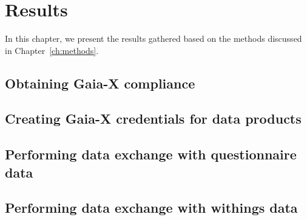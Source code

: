 \chapter{Results}\label{ch:results}

\begin{chapterabstract}
    In this chapter, we present the results gathered based on the methods discussed in Chapter~\ref{ch:methods}.
\end{chapterabstract}

\section{Obtaining Gaia-X compliance}\label{sec:obtaining-gaia-x-compliance}


\section{Creating Gaia-X credentials for data products}\label{sec:creating-gaia-x-credentials-for-data-products}


\section{Performing data exchange with questionnaire data}\label{sec:performing-data-exchange-with-questionnaire-data}


\section{Performing data exchange with withings data}\label{sec:performing-data-exchange-with-withings-data}
